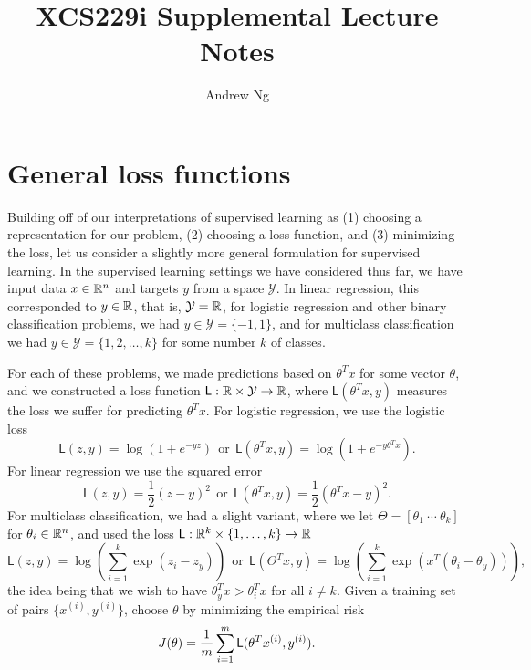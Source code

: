 \documentclass{article}
\newcommand{\loss}{\mathsf{L}}
\newcommand{\mc}[1]{\mathcal{#1}}
\newcommand{\half}{\frac{1}{2}}
\begin{document}
\title{XCS229i Supplemental Lecture Notes}
\author{Andrew Ng}
\date{}
\maketitle

\section{General loss functions}

Building off of our interpretations of supervised learning as (1) choosing a
representation for our problem, (2) choosing a loss function, and (3)
minimizing the loss, let us consider a slightly more general formulation for
supervised learning.  In the supervised learning settings we have considered
thus far, we have input data $x \in \mathbb{R}^n$ and targets $y$ from a space
$\mc{Y}$. In linear regression, this corresponded to $y \in \mathbb{R}$, that is,
$\mc{Y} = \R$, for logistic regression and other binary classification
problems, we had $y \in \mc{Y} = \{-1, 1\}$, and for multiclass
classification we had $y \in \mc{Y} = \{1, 2, \ldots, k\}$ for some number
$k$ of classes.

For each of these problems, we made predictions based on $\theta^T x$ for
some vector $\theta$, and we constructed a loss function $\loss : \R \times
\mc{Y} \to \R$, where $\loss(\theta^T x, y)$ measures the loss we suffer for
predicting $\theta^T x$. For logistic regression, we use the logistic loss
\begin{equation*}
  \loss(z, y) = \log(1 + e^{-y z})
  ~~ \mbox{or} ~~
  \loss(\theta^T x, y) = \log(1 + e^{-y \theta^T x}).
\end{equation*}
For linear regression we use the squared error
\begin{equation*}
  \loss(z, y) = \half (z - y)^2
  ~~ \mbox{or} ~~
  \loss(\theta^T x, y) = \half (\theta^T x - y)^2.
\end{equation*}
For multiclass classification, we had a slight variant, where we let
$\Theta = [\theta_1 ~ \cdots ~ \theta_k]$ for $\theta_i \in \mathbb{R}^n$, and
used the loss $\loss : \R^k \times \{1, \ldots, k\} \to \R$
\begin{equation*}
  \loss(z, y) = \log\left(\sum_{i = 1}^k \exp(z_i - z_y)\right)
  ~~ \mbox{or} ~~
  \loss(\Theta^T x, y) = \log\left(\sum_{i = 1}^k 
  \exp(x^T(\theta_i - \theta_y))\right),
\end{equation*}
the idea being that we wish to have $\theta_y^T x > \theta_i^T x$ for
all $i \neq k$.
Given a training set of pairs $\{x^{(i)}, y^{(i)}\}$, choose $\theta$
by minimizing the empirical risk
\begin{equation}
  \label{eqn:empirical-risk}
  J(\theta) = \frac{1}{m} \sum_{i = 1}^m \loss(\theta^T \xsi, \ysi).
\end{equation}
\end{document}
